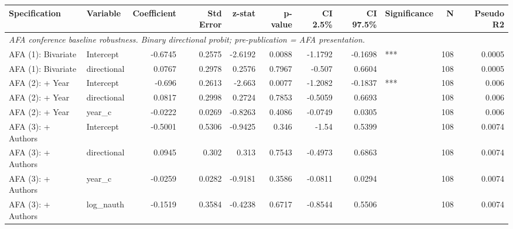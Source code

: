 \begin{tabular}{llrrrrrrlrr}
\toprule
Specification & Variable & Coefficient & Std Error & z-stat & p-value & CI 2.5\% & CI 97.5\% & Significance & N & Pseudo R2 \\
\midrule
\multicolumn{11}{l}{\textit{AFA conference baseline robustness. Binary directional probit; pre-publication = AFA presentation.}} \\[2pt]
AFA (1): Bivariate & Intercept & -0.6745 & 0.2575 & -2.6192 & 0.0088 & -1.1792 & -0.1698 & *** & 108 & 0.0005 \\
AFA (1): Bivariate & directional & 0.0767 & 0.2978 & 0.2576 & 0.7967 & -0.507 & 0.6604 &  & 108 & 0.0005 \\
AFA (2): + Year & Intercept & -0.696 & 0.2613 & -2.663 & 0.0077 & -1.2082 & -0.1837 & *** & 108 & 0.006 \\
AFA (2): + Year & directional & 0.0817 & 0.2998 & 0.2724 & 0.7853 & -0.5059 & 0.6693 &  & 108 & 0.006 \\
AFA (2): + Year & year_c & -0.0222 & 0.0269 & -0.8263 & 0.4086 & -0.0749 & 0.0305 &  & 108 & 0.006 \\
AFA (3): + Authors & Intercept & -0.5001 & 0.5306 & -0.9425 & 0.346 & -1.54 & 0.5399 &  & 108 & 0.0074 \\
AFA (3): + Authors & directional & 0.0945 & 0.302 & 0.313 & 0.7543 & -0.4973 & 0.6863 &  & 108 & 0.0074 \\
AFA (3): + Authors & year_c & -0.0259 & 0.0282 & -0.9181 & 0.3586 & -0.0811 & 0.0294 &  & 108 & 0.0074 \\
AFA (3): + Authors & log_nauth & -0.1519 & 0.3584 & -0.4238 & 0.6717 & -0.8544 & 0.5506 &  & 108 & 0.0074 \\
\bottomrule
\end{tabular}
